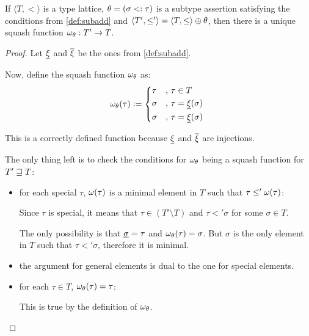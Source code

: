 \documentclass[main.tex]{subfiles}
\begin{document}
\begin{lemma}
    \label{lemma:subadd:squash}
    If $\langle T, \less \rangle$ is a type lattice, $\theta = (\sigma <: \tau)$
    is a subtype assertion satisfying the conditions from \cref{def:subadd}
    and $\langle T', \leq' \rangle = \langle T, \leq \rangle \oplus \theta$, then
    there is a unique squash function $\omega_{\theta} : T' \rightarrow T$.
\end{lemma}
\begin{proof}
    Let $\underline{\xi}$ and $\overline{\xi}$ be the ones from \cref{def:subadd}.

    Now, define the squash function $\omega_{\theta}$ as:
    \[
        \squash_{\theta}(\tau) \defeq
        \begin{cases*}
            \tau &, $\tau \in T$ \\
            \sigma &, $\tau = \subtyper{\xi}(\sigma)$ \\
            \sigma &, $\tau = \subtyper{\xi}(\sigma)$ \\
        \end{cases*}
    \]

    This is a correctly defined function because $\underline{\xi}$ and
    $\overline{\xi}$ are injections.

    The only thing left is to check the conditions for $\omega_{\theta}$
    being a squash function for $T' \sqsupseteq T$:

    \begin{itemize}
        \item for each special $\tau$, $\omega(\tau)$ is a minimal element in $T$ such that
            $\tau \leq' \omega(\tau)$:

            Since $\tau$ is special, it means that $\tau \in (T' \setminus T)$ and
            $\tau \less' \sigma$ for some $\sigma \in T$.

            The only possibility is that $\underline{\sigma} = \tau$ and
            $\omega_{\theta}(\tau) = \sigma$. But $\sigma$ is the only element
            in $T$ such that $\tau \less' \sigma$, therefore it is minimal.
        \item the argument for general elements is dual to the one
            for special elements.

        \item for each $\tau \in T$, $\omega_{\theta}(\tau) = \tau$:

            This is true by the definition of $\omega_{\theta}$.


\end{itemize}
\end{proof}
\end{document}
